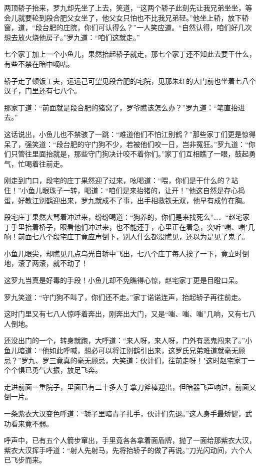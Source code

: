 \documentclass[12pt,oneside]{book}
\begin{document}
两顶轿子抬来，罗九却先坐了上去，笑道，``这两个轿子此刻先让我兄弟坐坐，等会儿就要轮到段合肥父女坐了，他父女只怕也不比我兄弟轻。''他坐上轿，放下轿窗，道，``段台肥的庄院，你们可认得么？''一人笑应道。``自然认得，咱们好几次想去放火烧他房子。''罗九道：``咱们这就走。''

七个家丁加上一个小鱼儿，果然抬起轿子就走，那七个家丁还不知此去要干什么，有些不禁在暗中嘀咕。

轿子走了顿饭工夫，远远己可望见段合肥的宅院，见那朱红的大门前也坐着七八个汉子，门里还有七八个。

那家丁道：``前面就是段合肥的猪窝了，罗爷瞧该怎么办？''罗九道：``笔直抬进去。''

这话说出，小鱼儿也不禁骇了一跳：``难道他们不怕江别鹤？''那些家丁们更是惊得呆了，强笑道：``段台肥的守门狗不少，若被他们咬一日，岂非冤狂。''罗九道：``你们只管往里面抬就是，那些守门狗决计咬不着你们。''家丁们互相瞧了一眼，鼓起勇气，忙喝着往前走。

刚走到门口，段宅的庄丁果然迎了过来，吆喝道：``喂，你们是干什么的？站住！''小鱼儿眼珠子一转，喝道：``咱们是来抬猪的，让开！''他这自然是存心捣蛋，好教江别鹤迎出来，罗九就成不了事，出手相救铁无双，他早有成竹在胸。

段宅庄丁果然大骂着冲过来，纷纷喝道：``狗养的，你们是来找死么''\ldots．``赵宅家丁手里抬着桥子，眼看他们冲过来，也不能还手，心里正在着急，突听''嗤、嗤"几响！前面七八个段宅庄丁竟应声倒下，别人什么都没瞧见，还以为是见了鬼了。

小鱼儿眼尖，却瞧见几点乌光自轿中飞出，七八个庄丁每人挨了一下，竟立时倒地，滚了两滚，就不动了！

这罗九当真是好毒的手段！小鱼儿却不免瞧得心惊，赵宅家丁更是目瞪口呆。

罗九笑道：``守门狗不叫了，你们还不走。''家丁诺诺连声，抬起轿子再往前走。

这时门里又有七八人惊呼着奔出，刚奔出大门，又是``嗤、嗤、嗤''几响，又有七八人倒地。

还没出门的一个，转身就跑，大呼道：``来人呀，来人呀，门外有恶鬼闯来了。''小鱼儿暗道：``他如此呼喊，想必可以将江别鹤引出来，这罗氏兄弟难道就毫无顾忌？''罗九、罗三竟真的毫无顾忌，大笑道：伙计们，往前走呀！"这时赵宅家丁一个个惧已勇气大振，放足飞奔。

走进前面一重院子，里面已有二十多人手拿刀斧棒迎出，但暗器飞声响过，前面又倒一片。

一条紫衣大汉变色呼道：``轿子里暗青子扎手，伙计们先退。''这人身手最矫健，武功看来竟不弱。

呼声中，已有五个人箭步窜出，手里竟各各拿着面盾牌，抛了一面给那紫衣大汉，紫衣大汉挥手呼道：``射人先射马，先将抬轿子的做了再说。''刀光闪动间，六个人已飞步而来。
\end{document}
